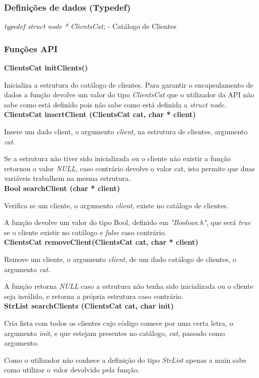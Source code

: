 \documentclass[12pt] {article}
\begin{document}
\subsubsection{Definições de dados (Typedef)}
\emph{typedef struct node * ClientsCat;} - Catálogo de Clientes

\subsubsection{Funções API}

\noindent\textbf{ClientsCat initClients()}
\par
Inicializa a estrutura do catálogo de clientes.  Para garantir o encapsulamento de dados a função devolve um valor do tipo \emph{ClientsCat} que o utilizador da API
não sabe como está definido pois não sabe como está definida a \emph{struct node.} \\

\noindent\textbf{ClientsCat insertClient (ClientsCat cat, char * client)}
\par Insere um dado client, o argumento \emph{client}, na estrutura de clientes, argumento \emph{cat}.
\par Se a estrutura não tiver sido inicializada ou o cliente não existir a função retornou o valor \emph{NULL},
caso contrário devolve o valor cat, isto permite que duas variáveis trabalhem na mesma estrutura. \\

\noindent \textbf {Bool searchClient (char * client)}
\par Verifica se um cliente, o argumento \emph{client}, existe no catálogo de clientes.
\par A função devolve um valor do tipo Bool, definido em \emph{"Boolean.h"}, que será \emph{true} se o
cliente existir no catálogo e \emph{false} caso contrário. \\

\noindent \textbf{ClientsCat removeClient(ClientsCat cat, char * client)}
\par Remove um cliente, o argumento \emph{client}, de um dado catálogo de clientes, o argumento \emph{cat}.
\par A função retorna \emph{NULL} caso a estrutura não tenha sido inicializada ou o cliente seja inválido, e
retorna a própria estrutura caso contrário. \\

\noindent \textbf{StrList searchClients (ClientsCat cat, char init)}
\par Cria lista com todos os clientes cujo código comece por uma certa letra, o argumento \emph{init}, e que
estejam presentes no catálogo, \emph{cat}, passado como argumento.
\par Como o utilizador não conhece a definição do tipo \emph{StrList} apenas a main sabe como utilizar
o valor devolvido pela função. \\
\end{document}
